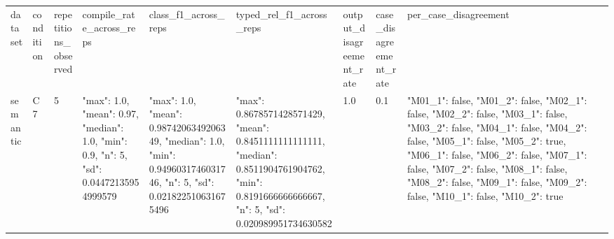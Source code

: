\begin{tabular}{lllllllll}
dataset & condition & repetitions\_observed & compile\_rate\_across\_reps & class\_f1\_across\_reps & typed\_rel\_f1\_across\_reps & output\_disagreement\_rate & case\_disagreement\_rate & per\_case\_disagreement \\
semantic & C7 & 5 & {"max": 1.0, "mean": 0.97, "median": 1.0, "min": 0.9, "n": 5, "sd": 0.04472135954999579} & {"max": 1.0, "mean": 0.9874206349206349, "median": 1.0, "min": 0.9496031746031746, "n": 5, "sd": 0.021822510631675496} & {"max": 0.8678571428571429, "mean": 0.8451111111111111, "median": 0.8511904761904762, "min": 0.8191666666666667, "n": 5, "sd": 0.020989951734630582} & 1.0 & 0.1 & {"M01\_1": false, "M01\_2": false, "M02\_1": false, "M02\_2": false, "M03\_1": false, "M03\_2": false, "M04\_1": false, "M04\_2": false, "M05\_1": false, "M05\_2": true, "M06\_1": false, "M06\_2": false, "M07\_1": false, "M07\_2": false, "M08\_1": false, "M08\_2": false, "M09\_1": false, "M09\_2": false, "M10\_1": false, "M10\_2": true} \\
\end{tabular}